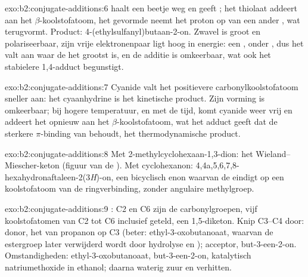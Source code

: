 \begin{solution}{exo:b2:conjugate-additions:6}
 haalt een beetje  weg en geeft ; het thiolaat addeert aan het $\beta$-koolstofatoom, het
gevormde  neemt het proton op van een ander , wat  terugvormt. Product:
4-(ethylsulfanyl)butaan-2-on. Zwavel is groot en polariseerbaar, zijn vrije elektronenpaar ligt hoog in energie: een , onder , dus het valt aan waar de  het grootst is, en de additie is
omkeerbaar, wat ook het stabielere 1,4-adduct begunstigt.
\end{solution}

\begin{solution}{exo:b2:conjugate-additions:7}
Cyanide valt het positievere carbonylkoolstofatoom sneller aan: het cyaanhydrine is het kinetische product. Zijn
vorming is omkeerbaar; bij hogere temperatuur, en met de tijd, komt cyanide weer vrij en addeert het opnieuw aan het
$\beta$-koolstofatoom, wat het adduct geeft dat de sterkere $\pi$-binding van  behoudt, het thermodynamische product.
\end{solution}

\begin{solution}{exo:b2:conjugate-additions:8}
Met 2-methylcyclohexaan-1,3-dion: het Wieland--Miescher-keton (figuur van de ).
Met cyclohexanon: 4,4a,5,6,7,8-hexahydronaftaleen-2(3\textit{H})-on, een bicyclisch enon waarvan de
 eindigt op een koolstofatoom van de ringverbinding, zonder angulaire methylgroep.
\end{solution}

\begin{solution}{exo:b2:conjugate-additions:9}
: C2 en C6 zijn de carbonylgroepen, vijf koolstofatomen van C2 tot C6 inclusief geteld,
een 1,5-diketon. Knip C3--C4 door: donor, het  van propanon op C3 (beter: ethyl-3-oxobutanoaat, waarvan de
estergroep later verwijderd wordt door hydrolyse en ); acceptor, but-3-een-2-on. Omstandigheden:
ethyl-3-oxobutanoaat, but-3-een-2-on, katalytisch natriumethoxide in ethanol; daarna waterig zuur en
verhitten.
\end{solution}

